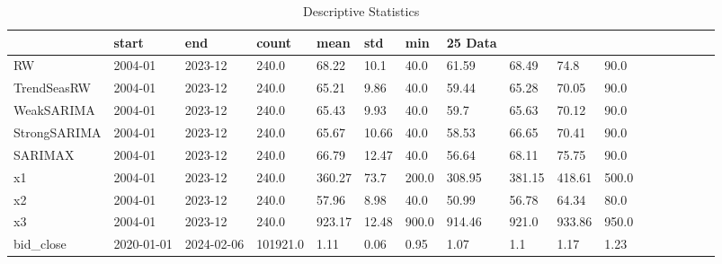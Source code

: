 \begin{table}
\caption{Descriptive Statistics}
\begin{tabular}{lllllllllll}
\toprule
 & start & end & count & mean & std & min & 25%
Data &  &  &  &  &  &  &  &  &  &  \\
\midrule
RW & 2004-01 & 2023-12 & 240.0 & 68.22 & 10.1 & 40.0 & 61.59 & 68.49 & 74.8 & 90.0 \\
TrendSeasRW & 2004-01 & 2023-12 & 240.0 & 65.21 & 9.86 & 40.0 & 59.44 & 65.28 & 70.05 & 90.0 \\
WeakSARIMA & 2004-01 & 2023-12 & 240.0 & 65.43 & 9.93 & 40.0 & 59.7 & 65.63 & 70.12 & 90.0 \\
StrongSARIMA & 2004-01 & 2023-12 & 240.0 & 65.67 & 10.66 & 40.0 & 58.53 & 66.65 & 70.41 & 90.0 \\
SARIMAX & 2004-01 & 2023-12 & 240.0 & 66.79 & 12.47 & 40.0 & 56.64 & 68.11 & 75.75 & 90.0 \\
x1 & 2004-01 & 2023-12 & 240.0 & 360.27 & 73.7 & 200.0 & 308.95 & 381.15 & 418.61 & 500.0 \\
x2 & 2004-01 & 2023-12 & 240.0 & 57.96 & 8.98 & 40.0 & 50.99 & 56.78 & 64.34 & 80.0 \\
x3 & 2004-01 & 2023-12 & 240.0 & 923.17 & 12.48 & 900.0 & 914.46 & 921.0 & 933.86 & 950.0 \\
bid_close & 2020-01-01 & 2024-02-06 & 101921.0 & 1.11 & 0.06 & 0.95 & 1.07 & 1.1 & 1.17 & 1.23 \\
\bottomrule
\end{tabular}
\end{table}
